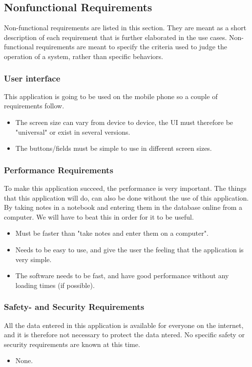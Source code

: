 \subsection{Nonfunctional Requirements}
Non-functional requirements are listed in this section. They are meant as a short description of each requirement that is further elaborated in the use cases. Non-functional requirements are meant to specify the criteria used to judge the operation of a system, rather than specific behaviors.

\subsubsection{User interface}
	This application is going to be used on the mobile phone so a couple of requirements follow.
	\begin{itemize}
		\item The screen size can vary from device to device, the UI must therefore be "universal" or exist in several versions. 
		\item The buttons/fields must be simple to use in different screen sizes.
	\end{itemize}
\subsubsection{Performance Requirements}
	To make this application succeed, the performance is very important. The things that this application will do, can also be done without the use of this application. By taking notes in a notebook and entering them in the database online from a computer. We will have to beat this in order for it to be useful.
	\begin{itemize}
		\item Must be faster than "take notes and enter them on a computer".
		\item Needs to be easy to use, and give the user the feeling that the application is very simple.
		\item The software needs to be fast, and have good performance without any loading times (if possible).
	\end{itemize}

\subsubsection{ Safety- and Security Requirements}
	All the data entered in this application  is available for everyone on the internet, and it is therefore not necessary to protect the data ntered. No specific safety or security requirements are known at this time.
	\begin{itemize}
		\item None.
	\end{itemize}
